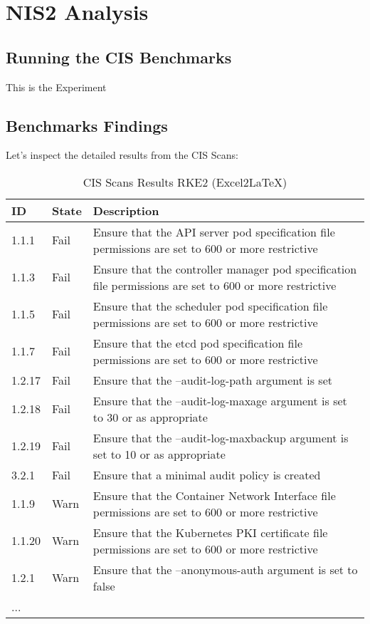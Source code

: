 %
%

\pagebreak
\section{NIS2 Analysis}

\onehalfspacing

\subsection{Running the CIS Benchmarks}

This is the Experiment

\subsection{Benchmarks Findings}

Let's inspect the detailed results from the CIS Scans:

\begin{table}[h]
  \centering
  \caption{CIS Scans Results RKE2 (Excel2LaTeX)}
    \begin{tabular}{| l | l | p{11.6cm} |}
    \hline
    ID & State & Description \\
    \hline\hline
    1.1.1 & Fail  & Ensure that the API server pod specification file permissions are set to 600 or more restrictive \\
    \hline
    1.1.3 & Fail  & Ensure that the controller manager pod specification file permissions are set to 600 or more restrictive \\
    \hline
    1.1.5 & Fail  & Ensure that the scheduler pod specification file permissions are set to 600 or more restrictive \\
    \hline
    1.1.7 & Fail  & Ensure that the etcd pod specification file permissions are set to 600 or more restrictive \\
    \hline
    1.2.17 & Fail  & Ensure that the --audit-log-path argument is set \\
    \hline
    1.2.18 & Fail  & Ensure that the --audit-log-maxage argument is set to 30 or as appropriate \\
    \hline
    1.2.19 & Fail  & Ensure that the --audit-log-maxbackup argument is set to 10 or as appropriate \\
    \hline
    3.2.1 & Fail  & Ensure that a minimal audit policy is created \\
    \hline
    1.1.9 & Warn  & Ensure that the Container Network Interface file permissions are set to 600 or more restrictive \\
    \hline
    1.1.20 & Warn  & Ensure that the Kubernetes PKI certificate file permissions are set to 600 or more restrictive \\
    \hline
    1.2.1 & Warn  & Ensure that the --anonymous-auth argument is set to false \\
    \hline
    ... & & \\
    \hline
    \end{tabular}%
  \label{tab:rke2Scan}%
\end{table}%

